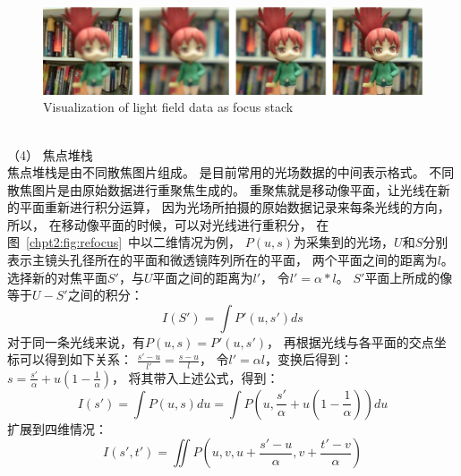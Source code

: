 \begin{figure}[t]
	\centering
	\includegraphics[width=0.95\linewidth]{figures/chapter2/focal_stack}
	{Visualization of light field data as focus stack}  
	\label{cpt2_fig7:focal_stack}
\end{figure}
\\
%
%
%
%
\indent
（4）
焦点堆栈
\\
%
%
%
%
\indent
焦点堆栈是由不同散焦图片组成。
是目前常用的光场数据的中间表示格式。
不同散焦图片是由原始数据进行重聚焦生成的。
重聚焦就是移动像平面，让光线在新的平面重新进行积分运算，
因为光场所拍摄的原始数据记录来每条光线的方向，所以，
在移动像平面的时候，可以对光线进行重积分，
在图~\ref{chpt2:fig:refocus}~中以二维情况为例，
$P(u,s)$为采集到的光场，$U$和$S$分别表示主镜头孔径所在的平面和微透镜阵列所在的平面，
两个平面之间的距离为$l$。选择新的对焦平面${S}' $，与$U$平面之间的距离为${l}' $，
令${l}' =\alpha * l  $。
${S}' $平面上所成的像等于$U-{S}' $之间的积分：
\begin{equation}
I\left ( {S}'  \right )  = \int {P}'\left ( u, s' \right ) ds 
\end{equation}
对于同一条光线来说，有$P\left ( u,s \right ) = P' \left ( u, s' \right ) $，
再根据光线与各平面的交点坐标可以得到如下关系：
$ \frac{{s}' - u}{{l}'} = \frac{s - u}{l} $，
令${l}' = \alpha l$，变换后得到：
$s = \frac{{s}'}{\alpha } + u\left ( 1 - \frac{1}{\alpha }  \right )  $，
将其带入上述公式，得到：
\begin{equation}
	I({s}') = \int P(u,s) du = \int P(u, \frac{s'}{\alpha } + u(1-\frac{1}{\alpha }))du
\end{equation}
扩展到四维情况：
\begin{equation}
	I(s',t') = \iint P(u, v, u + \frac{s' - u}{\alpha }, v + \frac{t' - v}{\alpha })
\end{equation}
